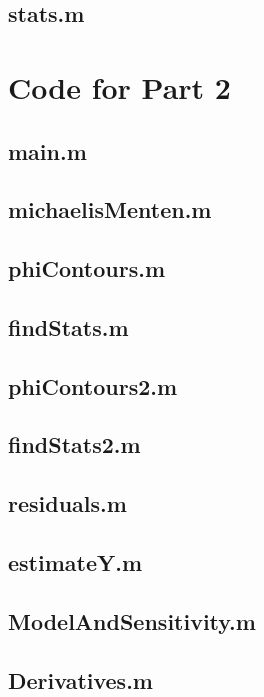 \newpage
\subsection{stats.m}



\newpage
\section{Code for Part 2} \label{code:part2}
\subsection{main.m}


\subsection{michaelisMenten.m}


\newpage
\subsection{phiContours.m}


\subsection{findStats.m}


\newpage
\subsection{phiContours2.m}


\subsection{findStats2.m}


\newpage
\subsection{residuals.m}


\subsection{estimateY.m}


\subsection{ModelAndSensitivity.m}


\subsection{Derivatives.m}
